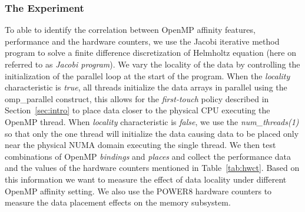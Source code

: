 \subsubsection{The Experiment}
To able to identify the correlation between OpenMP affinity features, performance and the hardware counters, we use the Jacobi iterative method program to solve a 
finite difference discretization of Helmholtz equation (here on referred to as \textit{Jacobi program}). We vary the locality of the data by controlling the initialization of the parallel loop at the start of the program. 
When the \textit{locality} characteristic is \textit{true}, all threads initialize the data arrays in parallel using the omp\_parallel construct, this allows for the 
\textit{first-touch} policy described in Section~\ref{sec:intro} to place data closer to the physical CPU executing the OpenMP thread. 
When \textit{locality} characteristic is \textit{false}, we use the \textit{num\_threads(1)} so that only the one thread will initialize the data causing data to be placed only near the physical NUMA domain executing the single thread. We then test combinations of OpenMP \textit{bindings} and \textit{places} and collect the performance data and the values of the hardware counters mentioned in Table~\ref{tab:hwct}. Based on this information we want to measure the effect of data locality under different OpenMP affinity setting. We also use the POWER8 hardware counters to measure the data placement effects on the memory subsystem.

